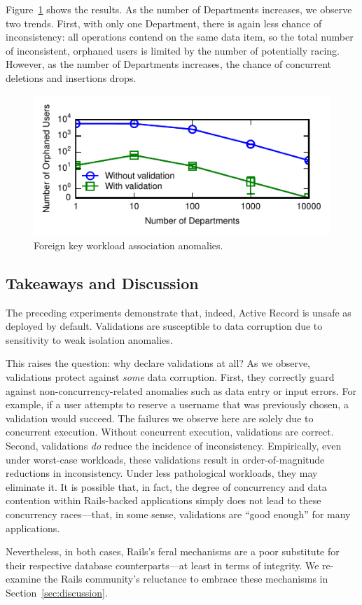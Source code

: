 Figure~\ref{fig:fk-workload} shows the results. As the number of
Departments increases, we observe two trends. First, with only one
Department, there is again less chance of inconsistency: all
operations contend on the same data item, so the total number of
inconsistent, orphaned users is limited by the number of potentially
racing. However, as the number of Departments increases, the chance of
concurrent deletions and insertions drops.

\begin{figure}
\includegraphics[width=\columnwidth]{figs/fk-workload-violations.pdf}\vspace{-1.5em}
\caption{Foreign key workload association anomalies.}\vspace{-.5em}
\label{fig:fk-workload}
\end{figure}

\subsection{Takeaways and Discussion}

The preceding experiments demonstrate that, indeed, Active Record is
unsafe as deployed by default. Validations are susceptible to data
corruption due to sensitivity to weak isolation anomalies.

This raises the question: why declare validations at all? As we
observe, validations protect against \textit{some} data
corruption. First, they correctly guard against
non-concurrency-related anomalies such as data entry or input
errors. For example, if a user attempts to reserve a username that was
previously chosen, a validation would succeed. The failures we observe
here are solely due to concurrent execution. Without concurrent
execution, validations are correct. Second, validations \textit{do}
reduce the incidence of inconsistency. Empirically, even under
worst-case workloads, these validations result in order-of-magnitude
reductions in inconsistency. Under less pathological workloads, they
may eliminate it. It is possible that, in fact, the
degree of concurrency and data contention within Rails-backed
applications simply does not lead to these concurrency races---that,
in some sense, validations are ``good enough'' for many applications.

Nevertheless, in both cases, Rails's feral mechanisms are a poor
substitute for their respective database counterparts---at least in
terms of integrity. We re-examine the Rails community's reluctance to
embrace these mechanisms in Section~\ref{sec:discussion}.

